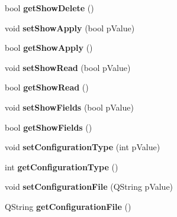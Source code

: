 \begin{DoxyCompactItemize}
\item 
\hypertarget{classQERecipe_a75ebde2fbce8f901d1eede80798c32a3}{
bool {\bfseries getShowDelete} ()}
\label{classQERecipe_a75ebde2fbce8f901d1eede80798c32a3}

\item 
\hypertarget{classQERecipe_acf84d5975239debb90309d6740cec948}{
void {\bfseries setShowApply} (bool pValue)}
\label{classQERecipe_acf84d5975239debb90309d6740cec948}

\item 
\hypertarget{classQERecipe_afcd4882cce1b6ac9c2b4656e0f068baf}{
bool {\bfseries getShowApply} ()}
\label{classQERecipe_afcd4882cce1b6ac9c2b4656e0f068baf}

\item 
\hypertarget{classQERecipe_ad0662f0cacbba69cee0ae269ae7c120c}{
void {\bfseries setShowRead} (bool pValue)}
\label{classQERecipe_ad0662f0cacbba69cee0ae269ae7c120c}

\item 
\hypertarget{classQERecipe_afbb5ea25000c4dbd0c023c02f4d60335}{
bool {\bfseries getShowRead} ()}
\label{classQERecipe_afbb5ea25000c4dbd0c023c02f4d60335}

\item 
\hypertarget{classQERecipe_a607cd80e1c2230182d05b691de350e77}{
void {\bfseries setShowFields} (bool pValue)}
\label{classQERecipe_a607cd80e1c2230182d05b691de350e77}

\item 
\hypertarget{classQERecipe_a08122a0040a37bd94a1c64923a41806a}{
bool {\bfseries getShowFields} ()}
\label{classQERecipe_a08122a0040a37bd94a1c64923a41806a}

\item 
\hypertarget{classQERecipe_aa0f6b5a91328a13f8632dc36160e7c8f}{
void {\bfseries setConfigurationType} (int pValue)}
\label{classQERecipe_aa0f6b5a91328a13f8632dc36160e7c8f}

\item 
\hypertarget{classQERecipe_a1df2d6a011d3ff2aaa0c194eeeb75a5c}{
int {\bfseries getConfigurationType} ()}
\label{classQERecipe_a1df2d6a011d3ff2aaa0c194eeeb75a5c}

\item 
\hypertarget{classQERecipe_a1a8fdee943aa1ba523e190fcd9d9d51c}{
void {\bfseries setConfigurationFile} (QString pValue)}
\label{classQERecipe_a1a8fdee943aa1ba523e190fcd9d9d51c}

\item 
\hypertarget{classQERecipe_a737a268d1ede59fb2368f68b0c8f97fe}{
QString {\bfseries getConfigurationFile} ()}
\label{classQERecipe_a737a268d1ede59fb2368f68b0c8f97fe}


\end{DoxyCompactItemize}
